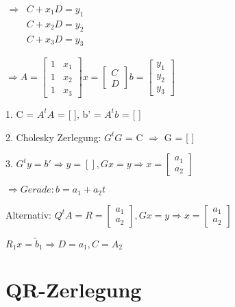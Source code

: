 \documentclass[12pt,a4paper]{article} %
\begin{document}
	$\begin{matrix}
		\Rightarrow & C + x_1D = y_1 \\
		& C + x_2D = y_2 \\
		& C + x_3D = y_3 
	\end{matrix}$
	
	$\Rightarrow A = \begin{bmatrix}
		1 & x_1 \\
		1 & x_2 \\
		1 & x_3 
	\end{bmatrix}
	x = 
	\begin{bmatrix}
		C \\
		D
	\end{bmatrix}
	b = 
	\begin{bmatrix}
		y_1 \\
		y_2 \\
		y_3
	\end{bmatrix}$
	
	1. C = $A^tA$ = [ ], b' = $A^tb$ = [ ]
	
	2. Cholesky Zerlegung: $G^tG$ = C $\Rightarrow$ G = [ ]
	
	3. $G^ty = b' \Rightarrow y = [ ], Gx = y \Rightarrow x = \begin{bmatrix}
		a_1 \\
		a_2
	\end{bmatrix}$
	
	$\Rightarrow Gerade: b = a_1 + a_2t$
	
	Alternativ: $Q^tA = R = \begin{bmatrix}
		a_1 \\
		a_2
	\end{bmatrix}
	, Gx = y \Rightarrow x = \begin{bmatrix}
	a_1 \\
	a_2
	\end{bmatrix}$
	
	$R_1x = \tilde{b}_1 \Rightarrow D = a_1, C = A_2$
	
	\newpage
	
	\section{QR-Zerlegung}
	
\end{document}

